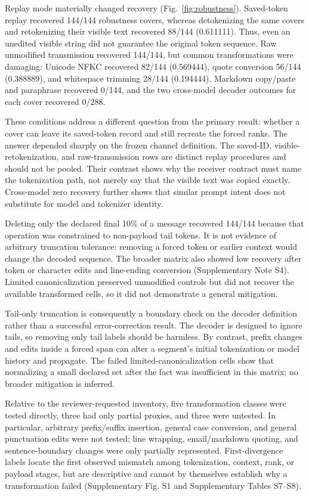 \documentclass[fleqn,10pt]{wlscirep}
\begin{document}
Replay mode materially changed recovery (Fig.~\ref{fig:robustness}). Saved-token replay recovered 144/144 robustness covers, whereas detokenizing the same covers and retokenizing their visible text recovered 88/144 (0.611111). Thus, even an unedited visible string did not guarantee the original token sequence. Raw unmodified transmission recovered 144/144, but common transformations were damaging: Unicode NFKC recovered 82/144 (0.569444), quote conversion 56/144 (0.388889), and whitespace trimming 28/144 (0.194444). Markdown copy/paste and paraphrase recovered 0/144, and the two cross-model decoder outcomes for each cover recovered 0/288.

These conditions address a different question from the primary result: whether a cover can leave its saved-token record and still recreate the forced ranks. The answer depended sharply on the frozen channel definition. The saved-ID, visible-retokenization, and raw-transmission rows are distinct replay procedures and should not be pooled. Their contrast shows why the receiver contract must name the tokenization path, not merely say that the visible text was copied exactly. Cross-model zero recovery further shows that similar prompt intent does not substitute for model and tokenizer identity.

Deleting only the declared final 10\% of a message recovered 144/144 because that operation was constrained to non-payload tail tokens. It is not evidence of arbitrary truncation tolerance: removing a forced token or earlier context would change the decoded sequence. The broader matrix also showed low recovery after token or character edits and line-ending conversion (Supplementary Note S4). Limited canonicalization preserved unmodified controls but did not recover the available transformed cells, so it did not demonstrate a general mitigation.

Tail-only truncation is consequently a boundary check on the decoder definition rather than a successful error-correction result. The decoder is designed to ignore tails, so removing only tail labels should be harmless. By contrast, prefix changes and edits inside a forced span can alter a segment's initial tokenization or model history and propagate. The failed limited-canonicalization cells show that normalizing a small declared set after the fact was insufficient in this matrix; no broader mitigation is inferred.

Relative to the reviewer-requested inventory, five transformation classes were tested directly, three had only partial proxies, and three were untested. In particular, arbitrary prefix/suffix insertion, general case conversion, and general punctuation edits were not tested; line wrapping, email/markdown quoting, and sentence-boundary changes were only partially represented. First-divergence labels locate the first observed mismatch among tokenization, context, rank, or payload stages, but are descriptive and cannot by themselves establish why a transformation failed (Supplementary Fig. S1 and Supplementary Tables S7--S8).
\end{document}
